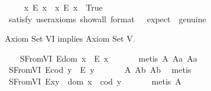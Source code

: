 \begin{isabellebody}
{\isafoldproof}%
%
\isadelimproof
%
\endisadelimproof
\isanewline
\ \ \isamarkupfalse%
\ \ {\isachardoublequoteopen}{\isacharparenleft}{\isasymexists}x{\isachardot}\ \isactrlbold {\isasymnot}{\isacharparenleft}E\ x{\isacharparenright}{\isacharparenright}\ {\isasymand}\ {\isacharparenleft}{\isasymexists}x{\isachardot}\ {\isacharparenleft}E\ x{\isacharparenright}{\isacharparenright}{\isachardoublequoteclose}\ \ True\ \ %
\ \isanewline
\ \ \ \ \isamarkupfalse%
\ {\isacharbrackleft}satisfy{\isacharcomma}\ user{\isacharunderscore}axioms{\isacharcomma}\ show{\isacharunderscore}all{\isacharcomma}\ format\ {\isacharequal}\ {}{\isacharcomma}\ expect\ {\isacharequal}\ genuine{\isacharbrackright}%
\isadelimproof
\ %
\endisadelimproof
%
\isatagproof
{}\isamarkupfalse%
%
\endisatagproof
{\isafoldproof}%
%
\isadelimproof
%
\endisadelimproof
%
\begin{isamarkuptext}%
Axiom Set VI implies Axiom Set V.%
\end{isamarkuptext}\isamarkuptrue%
\ \ \isamarkupfalse%
\ S{}FromVI{\isacharcolon}\ {\isachardoublequoteopen}E{\isacharparenleft}dom\ x{\isacharparenright}\ \isactrlbold {\isasymrightarrow}\ E\ x{\isachardoublequoteclose}\ \isanewline
%
\isadelimproof
\ \ \ \ %
\endisadelimproof
%
\isatagproof
{}\isamarkupfalse%
\ {\isacharparenleft}metis\ A{}\ A{}a\ A{}a{\isacharparenright}%
\endisatagproof
{\isafoldproof}%
%
\isadelimproof
\isanewline
%
\endisadelimproof
\ \ \isamarkupfalse%
\ S{}FromVI{\isacharcolon}\ {\isachardoublequoteopen}E{\isacharparenleft}cod\ y{\isacharparenright}\ \isactrlbold {\isasymrightarrow}\ E\ y{\isachardoublequoteclose}\ \isanewline
%
\isadelimproof
\ \ \ \ %
\endisadelimproof
%
\isatagproof
{}\isamarkupfalse%
\ A{}\ A{}b\ A{}b\ \isamarkupfalse%
\ metis%
\endisatagproof
{\isafoldproof}%
%
\isadelimproof
\isanewline
%
\endisadelimproof
\ \ \isamarkupfalse%
\ S{}FromVI{\isacharcolon}\ {\isachardoublequoteopen}E{\isacharparenleft}x{\isasymcdot}y{\isacharparenright}\ \isactrlbold {\isasymleftrightarrow}\ dom\ x\ {\isasymsimeq}\ cod\ y{\isachardoublequoteclose}\ \isanewline
%
\isadelimproof
\ \ \ \ %
\endisadelimproof
%
\isatagproof
{}\isamarkupfalse%
\ {\isacharparenleft}metis\ A{}{\isacharparenright}%
\endisatagproof

\end{isabellebody}
